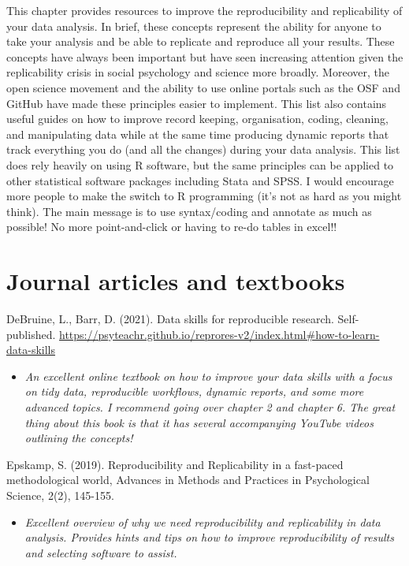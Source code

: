 \documentclass[
]{book}
\providecommand{\tightlist}{%
  \setlength{\itemsep}{0pt}\setlength{\parskip}{0pt}}
\begin{document}
This chapter provides resources to improve the reproducibility and replicability of your data analysis. In brief, these concepts represent the ability for anyone to take your analysis and be able to replicate and reproduce all your results. These concepts have always been important but have seen increasing attention given the replicability crisis in social psychology and science more broadly. Moreover, the open science movement and the ability to use online portals such as the OSF and GitHub have made these principles easier to implement. This list also contains useful guides on how to improve record keeping, organisation, coding, cleaning, and manipulating data while at the same time producing dynamic reports that track everything you do (and all the changes) during your data analysis. This list does rely heavily on using R software, but the same principles can be applied to other statistical software packages including Stata and SPSS. I would encourage more people to make the switch to R programming (it's not as hard as you might think). The main message is to use syntax/coding and annotate as much as possible! No more point-and-click or having to re-do tables in excel!!

\section{Journal articles and textbooks}\label{journal-articles-and-textbooks}

DeBruine, L., Barr, D. (2021). Data skills for reproducible research. Self-published. \url{https://psyteachr.github.io/reprores-v2/index.html\#how-to-learn-data-skills}

\begin{itemize}
\tightlist
\item
  \emph{An excellent online textbook on how to improve your data skills with a focus on tidy data, reproducible workflows, dynamic reports, and some more advanced topics. I recommend going over chapter 2 and chapter 6. The great thing about this book is that it has several accompanying YouTube videos outlining the concepts!}
\end{itemize}

Epskamp, S. (2019). Reproducibility and Replicability in a fast-paced methodological world, Advances in Methods and Practices in Psychological Science, 2(2), 145-155.

\begin{itemize}
\tightlist
\item
  \emph{Excellent overview of why we need reproducibility and replicability in data analysis. Provides hints and tips on how to improve reproducibility of results and selecting software to assist.}
\end{itemize}
\end{document}
